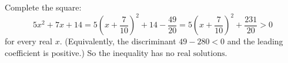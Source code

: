 Complete the square:
\[5x^2+7x+14=5\left(x+\dfrac{7}{10}\right)^2+14-\dfrac{49}{20}=5\left(x+\dfrac{7}{10}\right)^2+\dfrac{231}{20}>0\]
for every real $x$. (Equivalently, the discriminant $49-280<0$ and the leading coefficient is positive.) So the inequality has $\boxed{\text{no real solutions}}$.
